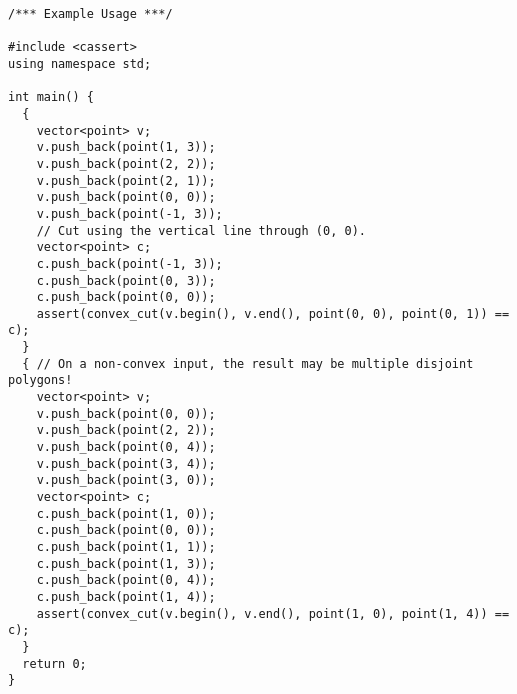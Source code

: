 \begin{lstlisting}
/*** Example Usage ***/

#include <cassert>
using namespace std;

int main() {
  {
    vector<point> v;
    v.push_back(point(1, 3));
    v.push_back(point(2, 2));
    v.push_back(point(2, 1));
    v.push_back(point(0, 0));
    v.push_back(point(-1, 3));
    // Cut using the vertical line through (0, 0).
    vector<point> c;
    c.push_back(point(-1, 3));
    c.push_back(point(0, 3));
    c.push_back(point(0, 0));
    assert(convex_cut(v.begin(), v.end(), point(0, 0), point(0, 1)) == c);
  }
  { // On a non-convex input, the result may be multiple disjoint polygons!
    vector<point> v;
    v.push_back(point(0, 0));
    v.push_back(point(2, 2));
    v.push_back(point(0, 4));
    v.push_back(point(3, 4));
    v.push_back(point(3, 0));
    vector<point> c;
    c.push_back(point(1, 0));
    c.push_back(point(0, 0));
    c.push_back(point(1, 1));
    c.push_back(point(1, 3));
    c.push_back(point(0, 4));
    c.push_back(point(1, 4));
    assert(convex_cut(v.begin(), v.end(), point(1, 0), point(1, 4)) == c);
  }
  return 0;
}
\end{lstlisting}
